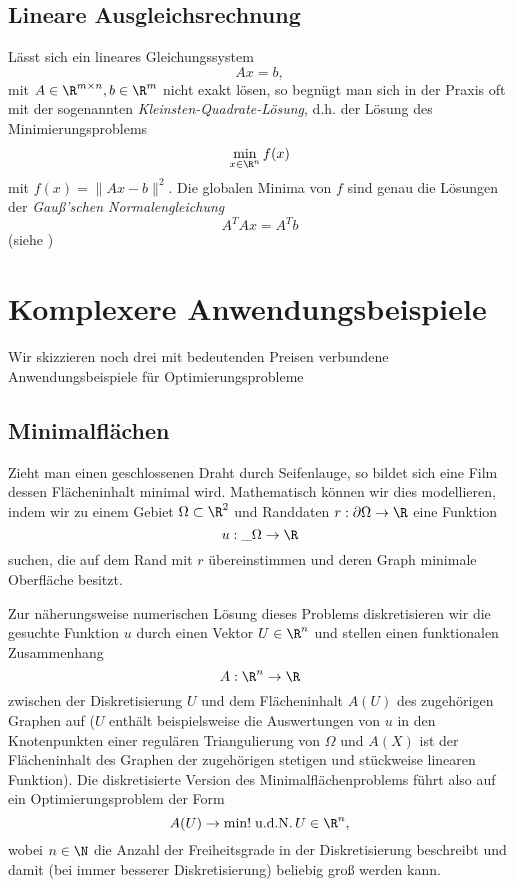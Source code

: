 \subsection{Lineare Ausgleichsrechnung}

Lässt sich ein lineares Gleichungssystem
\[
	Ax = b,
\]
mit $A \in \R^{m\times n}, b\in \R^m$ nicht exakt lösen, so begnügt man sich in der Praxis oft mit der sogenannten \emph{Kleinsten-Quadrate-Lösung}, d.h. der Lösung des Minimierungsproblems
\[
	\min_{x\in\R^n} f(x)
\]
mit $f(x) = \|Ax-b\|^2$.
Die globalen Minima von $f$ sind genau die Lösungen der \emph{Gauß'schen Normalengleichung}
\[
	A^T Ax = A^T b
\]
(siehe )


\section{Komplexere Anwendungsbeispiele}


Wir skizzieren noch drei mit bedeutenden Preisen verbundene Anwendungsbeispiele für Optimierungsprobleme

\subsection{Minimalflächen}

Zieht man einen geschlossenen Draht durch Seifenlauge, so bildet sich eine Film dessen Flächeninhalt minimal wird.
Mathematisch können wir dies modellieren, indem wir zu einem Gebiet $\Omega \subset \R^2$ und Randdaten $r: \partial \Omega \to \R$ eine Funktion
\[
	u: \_{\Omega} \to \R
\]
suchen, die auf dem Rand mit $r$ übereinstimmen und deren Graph minimale Oberfläche besitzt.

Zur näherungsweise numerischen Lösung dieses Problems diskretisieren wir die gesuchte Funktion $u$ durch einen Vektor $U \in \R^n$ und stellen einen funktionalen Zusammenhang
\[
	A: \R^n \to \R
\]
zwischen der Diskretisierung $U$ und dem Flächeninhalt $A(U)$ des zugehörigen Graphen auf
($U$ enthält beispielsweise die Auswertungen von $u$ in den Knotenpunkten einer regulären Triangulierung von $\Omega$ und $A(X)$ ist der Flächeninhalt des Graphen der zugehörigen stetigen und stückweise linearen Funktion).
Die diskretisierte Version des Minimalflächenproblems führt also auf ein Optimierungsproblem der Form
\[
	A(U) \to \min!
	\udN
	U \in \R^n,
\]
wobei $n \in \N$ die Anzahl der Freiheitsgrade in der Diskretisierung beschreibt und damit (bei immer besserer Diskretisierung) beliebig groß werden kann.

